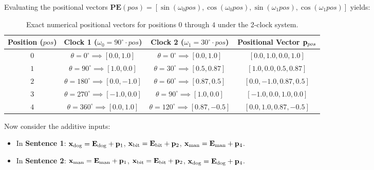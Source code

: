 \documentclass[../../main.tex]{subfiles}
\begin{document}
Evaluating the positional vectors $\mathbf{PE}(pos) = [\sin(\omega_0 pos), \cos(\omega_0 pos), \sin(\omega_1 pos), \cos(\omega_1 pos)]$ yields:
\begin{table}[htbp]
\centering
\small
\caption{Exact numerical positional vectors for positions $0$ through $4$ under the 2-clock system.}
\label{tab:clock_positions_table}
\begin{tabular}{c c c c}
\toprule
\textbf{Position ($pos$)} & \textbf{Clock 1 ($\omega_0 = 90^\circ \cdot pos$)} & \textbf{Clock 2 ($\omega_1 = 30^\circ \cdot pos$)} & \textbf{Positional Vector $\mathbf{p}_{pos}$} \\
\midrule
$0$ & $\theta = 0^\circ \implies [0.0, 1.0]$ & $\theta = 0^\circ \implies [0.0, 1.0]$ & $[0.0, 1.0, 0.0, 1.0]$ \\
$1$ & $\theta = 90^\circ \implies [1.0, 0.0]$ & $\theta = 30^\circ \implies [0.5, 0.87]$ & $[1.0, 0.0, 0.5, 0.87]$ \\
$2$ & $\theta = 180^\circ \implies [0.0, -1.0]$ & $\theta = 60^\circ \implies [0.87, 0.5]$ & $[0.0, -1.0, 0.87, 0.5]$ \\
$3$ & $\theta = 270^\circ \implies [-1.0, 0.0]$ & $\theta = 90^\circ \implies [1.0, 0.0]$ & $[-1.0, 0.0, 1.0, 0.0]$ \\
$4$ & $\theta = 360^\circ \implies [0.0, 1.0]$ & $\theta = 120^\circ \implies [0.87, -0.5]$ & $[0.0, 1.0, 0.87, -0.5]$ \\
\bottomrule
\end{tabular}
\end{table}

Now consider the additive inputs:
\begin{itemize}
    \item In \textbf{Sentence 1}:
    $\mathbf{x}_{\text{dog}} = \mathbf{E}_{\text{dog}} + \mathbf{p}_1$, \quad
    $\mathbf{x}_{\text{bit}} = \mathbf{E}_{\text{bit}} + \mathbf{p}_2$, \quad
    $\mathbf{x}_{\text{man}} = \mathbf{E}_{\text{man}} + \mathbf{p}_4$.
    \item In \textbf{Sentence 2}:
    $\mathbf{x}_{\text{man}} = \mathbf{E}_{\text{man}} + \mathbf{p}_1$, \quad
    $\mathbf{x}_{\text{bit}} = \mathbf{E}_{\text{bit}} + \mathbf{p}_2$, \quad
    $\mathbf{x}_{\text{dog}} = \mathbf{E}_{\text{dog}} + \mathbf{p}_4$.
\end{itemize}
\end{document}
